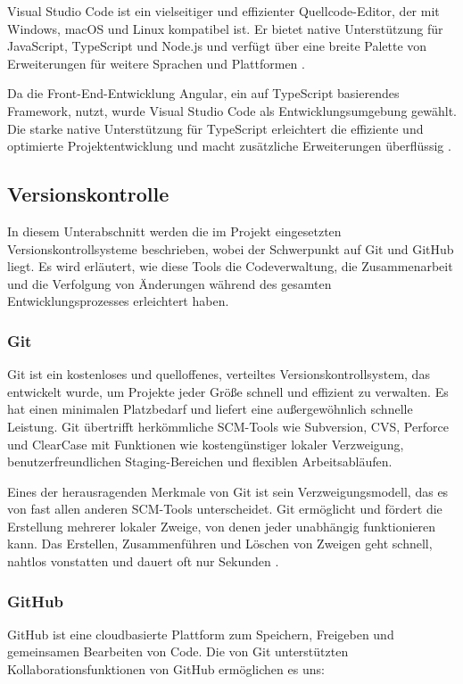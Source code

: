  Visual Studio Code ist ein vielseitiger und effizienter Quellcode-Editor, der mit Windows, macOS und Linux kompatibel ist. Er bietet native Unterstützung für JavaScript, TypeScript und Node.js und verfügt über eine breite Palette von Erweiterungen für weitere Sprachen und Plattformen \cite{visual-studio:o.J}.

Da die Front-End-Entwicklung Angular, ein auf TypeScript basierendes Framework, nutzt, wurde Visual Studio Code als Entwicklungsumgebung gewählt. Die starke native Unterstützung für TypeScript erleichtert die effiziente und optimierte Projektentwicklung und macht zusätzliche Erweiterungen überflüssig \cite{visualstudio-angular:o.J}.

\subsection{Versionskontrolle}
In diesem Unterabschnitt werden die im Projekt eingesetzten Versionskontrollsysteme beschrieben, wobei der Schwerpunkt auf Git und GitHub liegt. Es wird erläutert, wie diese Tools die Codeverwaltung, die Zusammenarbeit und die Verfolgung von Änderungen während des gesamten Entwicklungsprozesses erleichtert haben.
\subsubsection{Git}
Git ist ein kostenloses und quelloffenes, verteiltes Versionskontrollsystem, das entwickelt wurde, um Projekte jeder Größe schnell und effizient zu verwalten. Es hat einen minimalen Platzbedarf und liefert eine außergewöhnlich schnelle Leistung. Git übertrifft herkömmliche SCM-Tools wie Subversion, CVS, Perforce und ClearCase mit Funktionen wie kostengünstiger lokaler Verzweigung, benutzerfreundlichen Staging-Bereichen und flexiblen Arbeitsabläufen.

Eines der herausragenden Merkmale von Git ist sein Verzweigungsmodell, das es von fast allen anderen SCM-Tools unterscheidet. Git ermöglicht und fördert die Erstellung mehrerer lokaler Zweige, von denen jeder unabhängig funktionieren kann. Das Erstellen, Zusammenführen und Löschen von Zweigen geht schnell, nahtlos vonstatten und dauert oft nur Sekunden  \cite{git-scmr:o.J}.

\subsubsection{GitHub}
GitHub ist eine cloudbasierte Plattform zum Speichern, Freigeben und gemeinsamen Bearbeiten von Code. Die von Git unterstützten Kollaborationsfunktionen von GitHub ermöglichen es uns:

